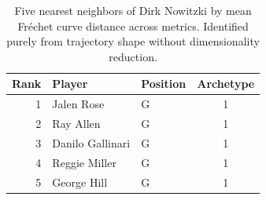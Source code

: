 \begin{table}[htbp]
  \centering\small
  \begin{tabular}{rllc}
    \toprule
    Rank & Player & Position & Archetype \\
    \midrule
    1 & Jalen Rose & G & 1 \\
    2 & Ray Allen & G & 1 \\
    3 & Danilo Gallinari & G & 1 \\
    4 & Reggie Miller & G & 1 \\
    5 & George Hill & G & 1 \\
    \bottomrule
  \end{tabular}
  \caption{Five nearest neighbors of Dirk Nowitzki by mean Fr\'{e}chet curve distance across metrics. Identified purely from trajectory shape without dimensionality reduction.}
  \label{tab:Dirk_Nowitzki_frechet_curve_neighbors}
\end{table}

